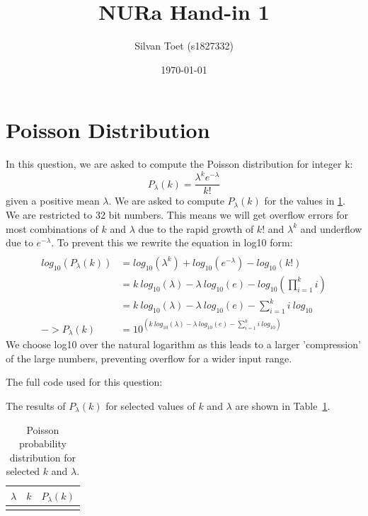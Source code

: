\documentclass{article}
\title{NURa Hand-in 1}
\author{Silvan Toet (s1827332)}
\date{\today}
\newcommand{\CodeDir}{Code}
\begin{document}
\maketitle

\section{Poisson Distribution}
In this question, we are asked to compute the Poisson distribution for integer k:
\begin{equation}
  P_\lambda(k) = \frac{\lambda^k e^{-\lambda}}{k!}
\end{equation}
given a positive mean $\lambda$. We are asked to compute $P_\lambda(k)$ for the values in \ref{tab:poisson}.
We are restricted to 32 bit numbers. This means we will get overflow errors for most combinations of $k$ and $\lambda$ due to the rapid growth of $k!$ and $\lambda^{k}$ and underflow due to $e^{-\lambda}$.
To prevent this we rewrite the equation in log10 form:
\begin{align}
  \\
  log_{10}(P_\lambda(k)) & = log_{10}(\lambda^k) + log_{10}(e^{-\lambda}) - log_{10}(k!)                    \\
                         & = k\ log_{10}(\lambda) - \lambda\ log_{10}(e) - log_{10}(\prod_{i=1}^{k} i)      \\
                         & = k\ log_{10}(\lambda) - \lambda\ log_{10}(e) - \sum_{i=1}^{k}i\ log_{10}        \\
  -> P_\lambda(k)        & = 10^{(k\ log_{10}(\lambda) - \lambda\ log_{10}(e) - \sum_{i=1}^{k}i\ log_{10})}
\end{align}
We choose log10 over the natural logarithm as this leads to a larger 'compression' of the large numbers, preventing overflow for a wider input range.


The full code used for this question:


The results of $P_\lambda(k)$ for selected values of $k$ and $\lambda$ are shown in Table~\ref{tab:poisson}.

\begin{table}[H]
  \centering
  \caption{Poisson probability distribution for selected $k$ and $\lambda$.}
  \label{tab:poisson}
  \begin{tabular}{|c|c|c|}
    \hline
    $\lambda$ & $k$ & $P_\lambda(k)$ \\
    \hline
           \\
    \hline
  \end{tabular}
\end{table}
\end{document}
